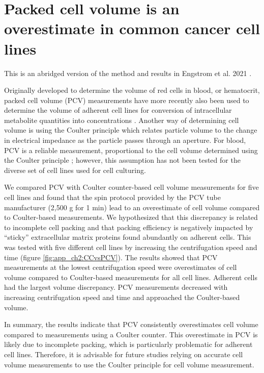 \chapter{Packed cell volume is an overestimate in common cancer cell lines}
\label{app_ch2_cell_vol}
This is an abridged version of the method and results in Engstrom et al. 2021 \cite{Engstrom2021-az}.

Originally developed to determine the volume of red cells in blood, or hematocrit, packed cell volume (PCV) measurements have more recently also been used to determine the volume of adherent cell lines for conversion of intracellular metabolite quantities into concentrations \cite{Park2016-ap, Liu2018-it, Yang2020-fs, Ghergurovich2020-nb}.
Another way of determining cell volume is using the Coulter principle which relates particle volume to the change in electrical impedance as the particle passes through an aperture.
For blood, PCV is a reliable measurement, proportional to the cell volume determined using the Coulter principle \cite{Carter1968-xy, Bull2001-xb}; however, this assumption has not been tested for the diverse set of cell lines used for cell culturing.

We compared PCV with Coulter counter-based cell volume measurements for five cell lines and found that the spin protocol provided by the PCV tube manufacturer (2,500 g for 1 min) lead to an overestimate of cell volume compared to Coulter-based measurements.
We hypothesized that this discrepancy is related to incomplete cell packing and that packing efficiency is negatively impacted by ``sticky'' extracellular matrix proteins found abundantly on adherent cells.
This was tested with five different cell lines by increasing the centrifugation speed and time (figure \ref{fig:app_ch2:CCvsPCV}).
The results showed that PCV measurements at the lowest centrifugation speed were overestimates of cell volume compared to Coulter-based measurements for all cell lines.
Adherent cells had the largest volume discrepancy.
PCV measurements decreased with increasing centrifugation speed and time and approached the Coulter-based volume.

In summary, the results indicate that PCV consistently overestimates cell volume compared to measurements using a Coulter counter.
This overestimate in PCV is likely due to incomplete packing, which is particularly problematic for adherent cell lines.
Therefore, it is advisable for future studies relying on accurate cell volume measurements to use the Coulter principle for cell volume measurement.

